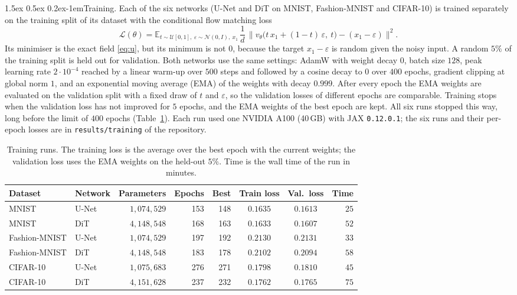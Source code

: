 \documentclass{article}
\makeatletter
\renewcommand{\normalsize}{\fontsize{10pt}{11pt}\selectfont}
\renewcommand{\paragraph}{\@startsection{paragraph}{4}{\z@}%
  {1.5ex \@plus 0.5ex \@minus 0.2ex}{-1em}{\normalsize\bfseries}}
\theoremstyle{remark}
\newcommand{\E}{\mathbb{E}}
\makeatother
\begin{document}
\paragraph{Training.} Each of the six networks (U-Net and DiT on MNIST, Fashion-MNIST and CIFAR-10) is trained separately on the training split of its dataset with the conditional flow matching loss
$$
  \mathcal L(\theta) = \E_{t \sim \mathcal U[0, 1],\ \varepsilon \sim \mathcal N(0, I),\ x_1}\,\frac1d\,\big\|v_\theta\big(t\,x_1 + (1 - t)\,\varepsilon,\ t\big) - (x_1 - \varepsilon)\big\|^2 .
$$
Its minimiser is the exact field \eqref{eq:u}, but its minimum is not $0$, because the target $x_1 - \varepsilon$ is random given the noisy input. A random $5\%$ of the training split is held out for validation. Both networks use the same settings: AdamW \citep{loshchilov2019adamw} with weight decay $0$, batch size $128$, peak learning rate $2 \cdot 10^{-4}$ reached by a linear warm-up over $500$ steps and followed by a cosine decay to $0$ over $400$ epochs, gradient clipping at global norm $1$, and an exponential moving average (EMA) of the weights with decay $0.999$. After every epoch the EMA weights are evaluated on the validation split with a fixed draw of $t$ and $\varepsilon$, so the validation losses of different epochs are comparable. Training stops when the validation loss has not improved for $5$ epochs, and the EMA weights of the best epoch are kept. All six runs stopped this way, long before the limit of $400$ epochs (Table~\ref{tab:training}). Each run used one NVIDIA A100 (40\,GB) with JAX \texttt{0.12.0.1}; the six runs and their per-epoch losses are in \texttt{results/training} of the repository.

\begin{table}[h]
\caption{Training runs. The training loss is the average over the best epoch with the current weights; the validation loss uses the EMA weights on the held-out $5\%$. Time is the wall time of the run in minutes.}\label{tab:training}
\centering
\begin{tabular}{llrrrccr}
\toprule
Dataset & Network & Parameters & Epochs & Best & Train loss & Val.\ loss & Time\\
\midrule
MNIST & U-Net & $1{,}074{,}529$ & 153 & 148 & $0.1635$ & $0.1613$ & $25$\\
MNIST & DiT & $4{,}148{,}548$ & 168 & 163 & $0.1633$ & $0.1607$ & $52$\\
Fashion-MNIST & U-Net & $1{,}074{,}529$ & 197 & 192 & $0.2130$ & $0.2131$ & $33$\\
Fashion-MNIST & DiT & $4{,}148{,}548$ & 183 & 178 & $0.2102$ & $0.2094$ & $58$\\
CIFAR-10 & U-Net & $1{,}075{,}683$ & 276 & 271 & $0.1798$ & $0.1810$ & $45$\\
CIFAR-10 & DiT & $4{,}151{,}628$ & 237 & 232 & $0.1762$ & $0.1765$ & $75$\\
\bottomrule
\end{tabular}
\end{table}
\end{document}

